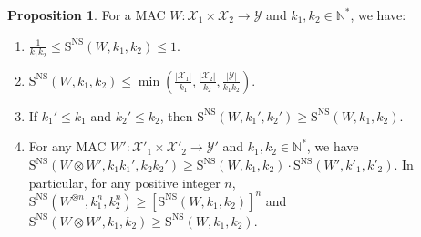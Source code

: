 \documentclass[11pt]{article}
\theoremstyle{definition}
\newtheorem{prop}[theo]{Proposition}
\theoremstyle{remark}
\begin{document}
\begin{prop}
  \label{prop:oneShot}
  For a MAC $W: \mathcal{X}_1 \times \mathcal{X}_2 \rightarrow \mathcal{Y}$ and $k_1,k_2 \in \mathbb{N}^*$, we have:
  \begin{enumerate}
  \item $\frac{1}{k_1k_2} \leq \mathrm{S}^{\mathrm{NS}}(W,k_1,k_2) \leq 1$.
  \item $\mathrm{S}^{\mathrm{NS}}(W,k_1,k_2) \leq \min\left(\frac{|\mathcal{X}_1|}{k_1}, \frac{|\mathcal{X}_2|}{k_2}, \frac{|\mathcal{Y}|}{k_1k_2} \right)$.
  \item If $k_1' \leq k_1$ and $k_2' \leq k_2$, then $\mathrm{S}^{\mathrm{NS}}(W,k_1',k_2') \geq \mathrm{S}^{\mathrm{NS}}(W,k_1,k_2)$.
    
  \item For any MAC $W': \mathcal{X}'_1 \times \mathcal{X}'_2 \rightarrow \mathcal{Y}'$ and $k_1,k_2 \in \mathbb{N}^*$, we have $\mathrm{S}^{\mathrm{NS}}(W \otimes W',k_1k_1',k_2k_2') \geq \mathrm{S}^{\mathrm{NS}}(W,k_1,k_2) \cdot \mathrm{S}^{\mathrm{NS}}(W',k'_1,k'_2)$. In particular, for any positive integer $n$, $\mathrm{S}^{\mathrm{NS}}(W^{\otimes n},k_1^n,k_2^n) \geq \left[\mathrm{S}^{\mathrm{NS}}(W,k_1,k_2)\right]^n$ and $\mathrm{S}^{\mathrm{NS}}(W \otimes W',k_1,k_2) \geq \mathrm{S}^{\mathrm{NS}}(W,k_1,k_2)$.
  \end{enumerate}
\end{prop}
\end{document}
